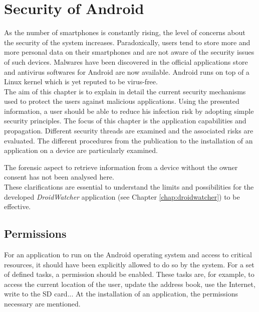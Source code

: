 \chapter{Security of Android}
\label{chap:and-secu}

As the number of smartphones is constantly rising, the level of concerns about the security of the system increases.
Paradoxically, users tend to store more and more personal data on their smartphones and are not aware of the security issues of such devices.
Malwares have been discovered in the official applications store and antivirus softwares for Android are now available.
Android runs on top of a Linux kernel which is yet reputed to be virus-free.\\

The aim of this chapter is to explain in detail the current security mechanisms used to protect the users against malicious applications.
Using the presented information, a user should be able to reduce his infection risk by adopting simple security principles.
The focus of this chapter is the application capabilities and propagation.
Different security threads are examined and the associated risks are evaluated.
The different procedures from the publication to the installation of an application on a device are particularly examined.

The forensic aspect to retrieve information from a device without the owner consent has not been analysed here.\\

These clarifications are essential to understand the limits and possibilities for the developed \emph{DroidWatcher} application (see Chapter \ref{chap:droidwatcher}) to be effective.

\section{Permissions}
\label{sec:permissions}

For an application to run on the Android operating system and access to critical resources, it should have been explicitly allowed to do so by the system. %
For a set of defined tasks, a permission should be enabled.
These tasks are, for example, to access the current location of the user, update the address book, use the Internet, write to the SD card...
At the installation of an application, the permissions necessary are mentioned.\\

